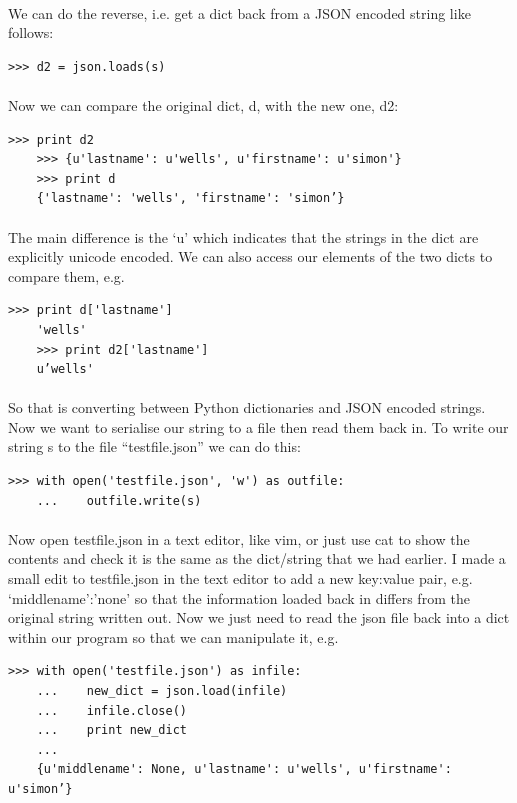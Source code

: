 \documentclass[12pt, a4paper, oneside]{book}
\begin{document}
{\paragraph{} We can do the reverse, i.e. get a dict back from a JSON encoded string like follows:
\begin{lstlisting}[style=DOS]
    >>> d2 = json.loads(s)
\end{lstlisting}

\paragraph{} Now we can compare the original dict, d, with the new one, d2:
\begin{lstlisting}[style=DOS]
    >>> print d2
    >>> {u'lastname': u'wells', u'firstname': u'simon'}
    >>> print d
    {'lastname': 'wells', 'firstname': 'simon’}
\end{lstlisting}

\paragraph{} The main difference is the ‘u’ which indicates that the strings in the dict are explicitly unicode encoded. We can also access our elements of  the two dicts to compare them, e.g.
\begin{lstlisting}[style=DOS]
    >>> print d['lastname']
    'wells'
    >>> print d2['lastname']
    u’wells'
\end{lstlisting}

\paragraph{} So that is converting between Python dictionaries and JSON encoded strings. Now we want to serialise our string to a file then read them back in. To write our string s to the file “testfile.json” we can do this:
\begin{lstlisting}[style=DOS]
    >>> with open('testfile.json', 'w') as outfile:
    ...    outfile.write(s)
\end{lstlisting}

\paragraph{} Now open testfile.json in a text editor, like vim, or just use cat to show the contents and check it is the same as the dict/string that we had earlier. I made a small edit to testfile.json in the text editor to add a new key:value pair, e.g. ‘middlename':’none’ so that the information loaded back in differs from the original string written out. Now we just need to read the json file back into a dict within our program so that we can manipulate it, e.g.
\begin{lstlisting}[style=DOS]
    >>> with open('testfile.json') as infile:
    ...    new_dict = json.load(infile)
    ...    infile.close()
    ...    print new_dict
    ... 
    {u'middlename': None, u'lastname': u'wells', u'firstname': u'simon’}
\end{lstlisting}

}
\end{document}
